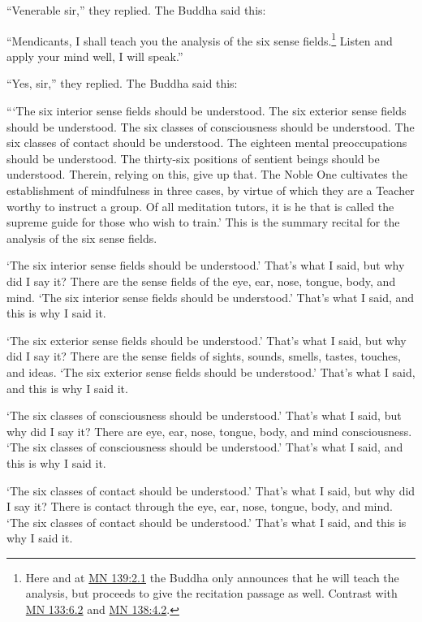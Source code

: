 \documentclass[12pt,openany]{book}%
\begin{document}
“Venerable sir,” they replied. The Buddha said this: 

“Mendicants, I shall teach you the analysis of the six sense fields.\footnote{Here and at \href{https://suttacentral.net/mn139/en/sujato\#2.1}{MN 139:2.1} the Buddha only announces that he will teach the analysis, but proceeds to give the recitation passage as well. Contrast with \href{https://suttacentral.net/mn133/en/sujato\#6.2}{MN 133:6.2} and \href{https://suttacentral.net/mn138/en/sujato\#4.2}{MN 138:4.2}. } Listen and apply your mind well, I will speak.” 

“Yes, sir,” they replied. The Buddha said this: 

“‘The six interior sense fields should be understood. The six exterior sense fields should be understood. The six classes of consciousness should be understood. The six classes of contact should be understood. The eighteen mental preoccupations should be understood. The thirty-six positions of sentient beings should be understood. Therein, relying on this, give up that. The Noble One cultivates the establishment of mindfulness in three cases, by virtue of which they are a Teacher worthy to instruct a group. Of all meditation tutors, it is he that is called the supreme guide for those who wish to train.’ This is the summary recital for the analysis of the six sense fields. 

‘The six interior sense fields should be understood.’ That’s what I said, but why did I say it? There are the sense fields of the eye, ear, nose, tongue, body, and mind. ‘The six interior sense fields should be understood.’ That’s what I said, and this is why I said it. 

‘The six exterior sense fields should be understood.’ That’s what I said, but why did I say it? There are the sense fields of sights, sounds, smells, tastes, touches, and ideas. ‘The six exterior sense fields should be understood.’ That’s what I said, and this is why I said it. 

‘The six classes of consciousness should be understood.’ That’s what I said, but why did I say it? There are eye, ear, nose, tongue, body, and mind consciousness. ‘The six classes of consciousness should be understood.’ That’s what I said, and this is why I said it. 

‘The six classes of contact should be understood.’ That’s what I said, but why did I say it? There is contact through the eye, ear, nose, tongue, body, and mind. ‘The six classes of contact should be understood.’ That’s what I said, and this is why I said it. 
\end{document}

